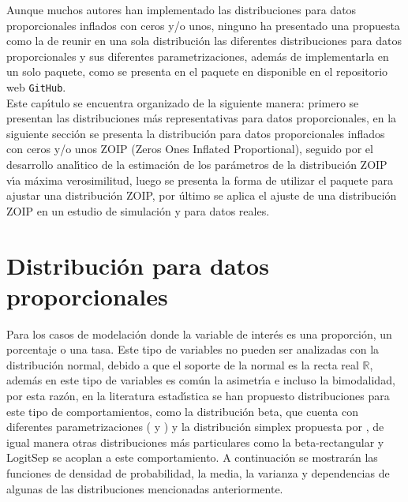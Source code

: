 Aunque muchos autores han implementado las distribuciones para datos proporcionales inflados con ceros y/o unos, ninguno ha presentado una propuesta como la de reunir en una sola distribuci\'{o}n las diferentes distribuciones para datos proporcionales y sus diferentes parametrizaciones, adem\'{a}s de implementarla en un solo paquete, como se presenta en el paquete  en \cite{R} disponible en el repositorio web \verb|GitHub|.\\

Este cap\'{\i}tulo se encuentra organizado de la siguiente manera: primero se presentan las distribuciones m\'{a}s representativas para datos proporcionales, en la siguiente secci\'{o}n se presenta la distribuci\'{o}n para datos proporcionales inflados con ceros y/o unos ZOIP (Zeros Ones Inflated Proportional), seguido por el desarrollo anal\'{\i}tico de la estimaci\'{o}n de los par\'{a}metros de la distribuci\'{o}n ZOIP v\'{\i}a m\'{a}xima verosimilitud, luego se presenta la forma de utilizar el paquete  para ajustar una distribuci\'{o}n ZOIP, por \'{u}ltimo se aplica el ajuste de una distribuci\'{o}n ZOIP en un estudio de simulaci\'{o}n y para datos reales.


\section{Distribuci\'{o}n para datos proporcionales} \label{Sec_dist_prop}

Para los casos de modelaci\'{o}n donde la variable de inter\'{e}s es una proporci\'{o}n, un porcentaje o una tasa. Este tipo de variables no pueden ser analizadas con la distribuci\'{o}n normal, debido a que el soporte de la normal es la recta real $\mathbb{R}$, adem\'{a}s en este tipo de variables es com\'{u}n la asimetr\'{\i}a e incluso la bimodalidad, por esta raz\'{o}n, en la literatura estad\'{\i}stica se han propuesto distribuciones para este tipo de comportamientos, como la distribuci\'{o}n beta, que cuenta con diferentes parametrizaciones (\cite{Ferrari2} y \cite{Stasinopoulos2}) y la distribuci\'{o}n simplex propuesta por \cite{Barndorff1}, de igual manera otras distribuciones m\'{a}s particulares como la beta-rectangular \citep{Hahn1} y LogitSep \citep{Hossain1} se acoplan a este comportamiento. A continuaci\'{o}n se mostrar\'{a}n las funciones de densidad de probabilidad, la media, la varianza y dependencias de algunas de las distribuciones mencionadas anteriormente.

